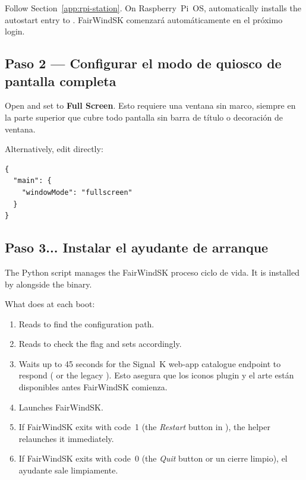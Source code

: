Follow Section~\ref{app:rpi-station}.
On Raspberry~Pi~OS,  automatically installs the
 autostart entry to
.
FairWindSK comenzará automáticamente en el próximo login.

\subsection{Paso 2 --- Configurar el modo de quiosco de pantalla completa}

Open  and set  to
\textbf{Full Screen}.
Esto requiere una ventana sin marco, siempre en la parte superior que cubre todo
pantalla sin barra de título o decoración de ventana.

Alternatively, edit  directly:

\begin{lstlisting}
{
  "main": {
    "windowMode": "fullscreen"
  }
}
\end{lstlisting}

\subsection{Paso 3... Instalar el ayudante de arranque}

The  Python script manages the FairWindSK
proceso ciclo de vida.
It is installed by  alongside the binary.

What  does at each boot:

\begin{enumerate}
  \item Reads  to find the configuration path.
  \item Reads  to check the 
        flag and sets  accordingly.
  \item Waits up to 45 seconds for the Signal~K web-app catalogue
        endpoint to respond ( or the legacy
        ).
Esto asegura que los iconos plugin y el arte están disponibles antes
FairWindSK comienza.
  \item Launches FairWindSK.
  \item If FairWindSK exits with code~1 (the \textit{Restart} button in
        ), the helper relaunches it immediately.
  \item If FairWindSK exits with code~0 (the \textit{Quit} button or
un cierre limpio), el ayudante sale limpiamente.
\end{enumerate}

